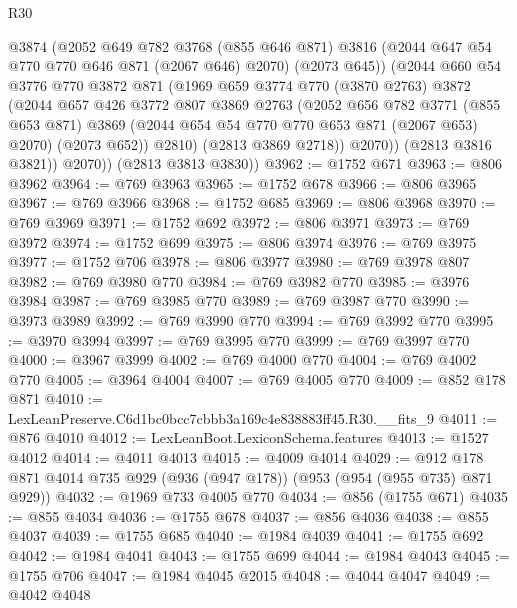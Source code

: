\begin{lexlean}{R30}
\begin{coremodule}
              @3874
              (@2052
                @649
                @782
                @3768
                (@855 @646 @871)
                @3816
                (@2044 @647 @54 @770 @770 @646 @871 (@2067 @646) @2070)
                (@2073 @645))
              (@2044
                @660
                @54
                @3776
                @770
                @3872
                @871
                (@1969
                  @659
                  @3774
                  @770
                  (@3870 @2763)
                  @3872
                  (@2044
                    @657
                    @426
                    @3772
                    @807
                    @3869
                    @2763
                    (@2052
                      @656
                      @782
                      @3771
                      (@855 @653 @871)
                      @3869
                      (@2044 @654 @54 @770 @770 @653 @871 (@2067 @653) @2070)
                      (@2073 @652))
                    @2810)
                  (@2813 @3869 @2718))
                @2070))
            (@2813 @3816 @3821))
          @2070))
      (@2813 @3813 @3830))
@3962 := @1752 @671
@3963 := @806 @3962
@3964 := @769 @3963
@3965 := @1752 @678
@3966 := @806 @3965
@3967 := @769 @3966
@3968 := @1752 @685
@3969 := @806 @3968
@3970 := @769 @3969
@3971 := @1752 @692
@3972 := @806 @3971
@3973 := @769 @3972
@3974 := @1752 @699
@3975 := @806 @3974
@3976 := @769 @3975
@3977 := @1752 @706
@3978 := @806 @3977
@3980 := @769 @3978 @807
@3982 := @769 @3980 @770
@3984 := @769 @3982 @770
@3985 := @3976 @3984
@3987 := @769 @3985 @770
@3989 := @769 @3987 @770
@3990 := @3973 @3989
@3992 := @769 @3990 @770
@3994 := @769 @3992 @770
@3995 := @3970 @3994
@3997 := @769 @3995 @770
@3999 := @769 @3997 @770
@4000 := @3967 @3999
@4002 := @769 @4000 @770
@4004 := @769 @4002 @770
@4005 := @3964 @4004
@4007 := @769 @4005 @770
@4009 := @852 @178 @871
@4010 := LexLeanPreserve.C6d1bc0bcc7cbbb3a169c4e838883ff45.R30.__fits_9
@4011 := @876 @4010
@4012 := LexLeanBoot.LexiconSchema.features
@4013 := @1527 @4012
@4014 := @4011 @4013
@4015 := @4009 @4014
@4029 := @912 @178 @871 @4014 @735 @929 (@936 (@947 @178)) (@953 (@954 (@955 @735) @871 @929))
@4032 := @1969 @733 @4005 @770
@4034 := @856 (@1755 @671)
@4035 := @855 @4034
@4036 := @1755 @678
@4037 := @856 @4036
@4038 := @855 @4037
@4039 := @1755 @685
@4040 := @1984 @4039
@4041 := @1755 @692
@4042 := @1984 @4041
@4043 := @1755 @699
@4044 := @1984 @4043
@4045 := @1755 @706
@4047 := @1984 @4045 @2015
@4048 := @4044 @4047
@4049 := @4042 @4048

\end{coremodule}
\end{lexlean}
